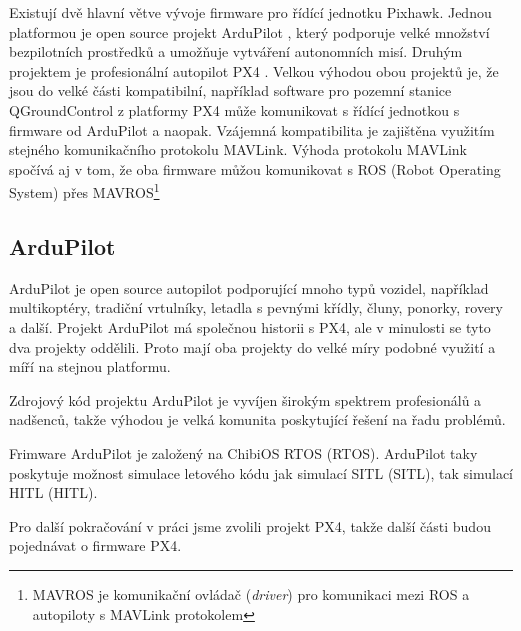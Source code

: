 Existují dvě hlavní větve vývoje firmware pro řídící jednotku Pixhawk. Jednou platformou je open source projekt ArduPilot \cite{ARDU}, který podporuje velké množství bezpilotních prostředků a umožňuje vytváření autonomních misí. Druhým projektem je profesionální autopilot PX4 \cite{PX4ORG}. Velkou výhodou obou projektů je, že jsou do velké části kompatibilní, například software pro pozemní stanice QGroundControl z platformy PX4 může komunikovat s řídící jednotkou s firmware od ArduPilot a naopak. Vzájemná kompatibilita je zajištěna využitím stejného komunikačního protokolu MAVLink. Výhoda protokolu MAVLink spočívá aj v tom, že oba firmware můžou komunikovat s ROS (Robot Operating System) přes MAVROS\footnote{MAVROS je komunikační ovládač (\textit{driver}) pro komunikaci mezi ROS a autopiloty s MAVLink protokolem}

\subsection{ArduPilot}

ArduPilot je open source autopilot podporující mnoho typů vozidel, například multikoptéry, tradiční vrtulníky, letadla s pevnými křídly, čluny, ponorky, rovery a další. Projekt ArduPilot má společnou historii s PX4, ale v minulosti se tyto dva projekty oddělili. Proto mají oba projekty do velké míry podobné využití a míří na stejnou platformu.

Zdrojový kód projektu ArduPilot je vyvíjen širokým spektrem profesionálů a nadšenců, takže výhodou je velká komunita poskytující řešení na řadu problémů.

Frimware ArduPilot je založený na ChibiOS \acs{RTOS} (\acl{RTOS}). ArduPilot taky poskytuje možnost simulace letového kódu jak simulací \acs{SITL} (\acl{SITL}), tak simulací \acs{HITL} (\acl{HITL}). \cite{ARDU}

Pro další pokračování v práci jsme zvolili projekt PX4, takže další části budou pojednávat o firmware PX4.

